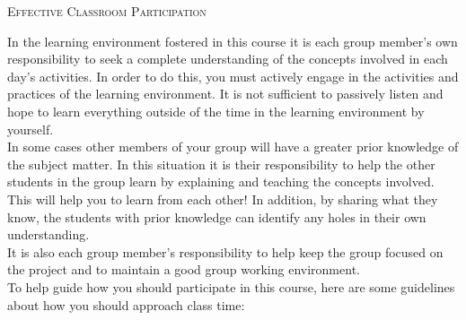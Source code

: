 \documentclass[oneside,letterpaper,11pt]{exam}
\begin{document}
\begin{center}
  \normalsize{\textsc{Effective Classroom Participation}}
  \\\vspace{0.25cm}
  \vspace{0.25cm}
\end{center}

\pointsinmargin

{\noindent
In the learning environment fostered in this course it is each group member's own responsibility to seek a complete understanding of the concepts involved in each day's activities. In order to do this, you must actively engage in the activities and practices of the learning environment. It is not sufficient to passively listen and hope to learn everything outside of the time in the learning environment by yourself.} \\

{\noindent In some cases other members of your group will have a greater prior knowledge of the subject matter. In this situation it is their responsibility to help the other students in the group learn by explaining and teaching the concepts involved. This will help you to learn from each other! In addition, by sharing what they know, the students with prior knowledge can identify any holes in their own understanding.}\\

{\noindent It is also each group member's responsibility to help keep the group focused on the project and to maintain a good group working environment.}\\

{\noindent To help guide how you should participate in this course, here are some guidelines about how you should approach class time:}
\end{document}
